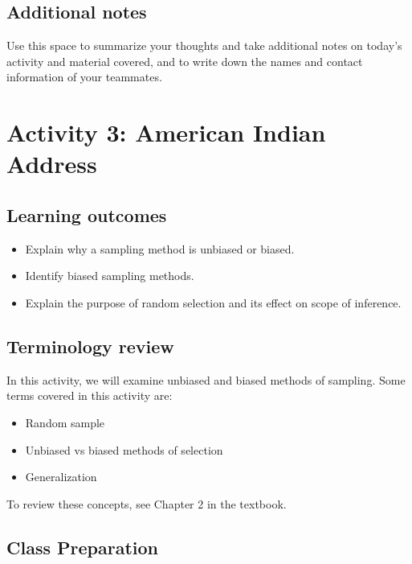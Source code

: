 \documentclass[
]{report}
\begin{document}
\subsection{Additional notes}\label{additional-notes-1}

Use this space to summarize your thoughts and take additional notes on today's activity and material covered, and to write down the names and contact information of your teammates.

\newpage

\section{Activity 3: American Indian Address}\label{activity-3-american-indian-address}


\subsection{Learning outcomes}\label{learning-outcomes-2}

\begin{itemize}
\item
  Explain why a sampling method is unbiased or biased.
\item
  Identify biased sampling methods.
\item
  Explain the purpose of random selection and its effect on scope of inference.
\end{itemize}

\subsection{Terminology review}\label{terminology-review-2}

In this activity, we will examine unbiased and biased methods of sampling. Some terms covered in this activity are:

\begin{itemize}
\item
  Random sample
\item
  Unbiased vs biased methods of selection
\item
  Generalization
\end{itemize}

To review these concepts, see Chapter 2 in the textbook.

\subsection{Class Preparation}\label{class-preparation}
\end{document}
